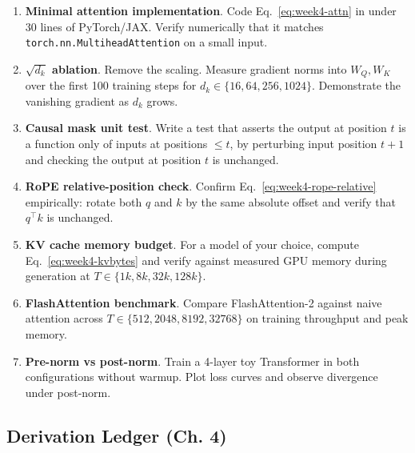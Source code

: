\begin{enumerate}
  \item \textbf{Minimal attention implementation}. Code Eq.\,
        \eqref{eq:week4-attn} in under 30 lines of PyTorch/JAX. Verify
        numerically that it matches \texttt{torch.nn.MultiheadAttention}
        on a small input.
  \item \textbf{$\sqrt{d_k}$ ablation}. Remove the scaling. Measure
        gradient norms into $W_Q, W_K$ over the first 100 training
        steps for $d_k \in \{16, 64, 256, 1024\}$. Demonstrate the
        vanishing gradient as $d_k$ grows.
  \item \textbf{Causal mask unit test}. Write a test that asserts the
        output at position $t$ is a function only of inputs at
        positions $\le t$, by perturbing input position $t+1$ and
        checking the output at position $t$ is unchanged.
  \item \textbf{RoPE relative-position check}. Confirm Eq.\,
        \eqref{eq:week4-rope-relative} empirically: rotate both $q$
        and $k$ by the same absolute offset and verify that
        $q^{\top}k$ is unchanged.
  \item \textbf{KV cache memory budget}. For a model of your choice,
        compute Eq.~\eqref{eq:week4-kvbytes} and verify against
        measured GPU memory during generation at $T \in \{1k, 8k,
        32k, 128k\}$.
  \item \textbf{FlashAttention benchmark}. Compare FlashAttention-2
        against naive attention across $T \in \{512, 2048, 8192,
        32768\}$ on training throughput and peak memory.
  \item \textbf{Pre-norm vs post-norm}. Train a 4-layer toy
        Transformer in both configurations without warmup. Plot
        loss curves and observe divergence under post-norm.
\end{enumerate}

\subsection*{Derivation Ledger (Ch. 4)}

